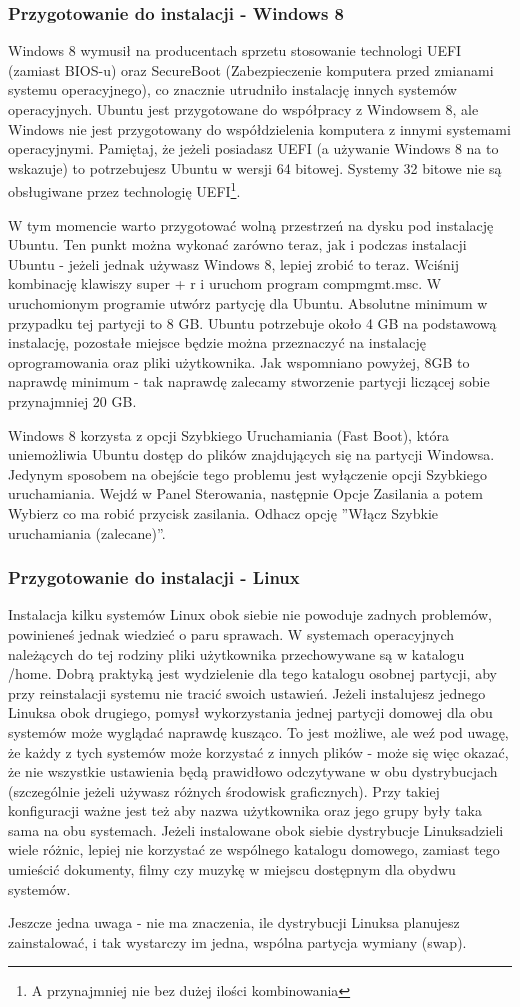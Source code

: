 \subsubsection{Przygotowanie do instalacji - Windows 8}
\label{sec:przygotowanie_windows8}
Windows 8 wymusił na producentach sprzetu stosowanie technologi UEFI (zamiast BIOS-u) oraz SecureBoot (Zabezpieczenie komputera przed zmianami systemu operacyjnego), co znacznie utrudniło instalację innych systemów operacyjnych. Ubuntu jest przygotowane do współpracy z Windowsem 8, ale Windows nie jest przygotowany do współdzielenia komputera z innymi systemami operacyjnymi. Pamiętaj, że jeżeli posiadasz UEFI (a używanie Windows 8 na to wskazuje) to potrzebujesz Ubuntu w wersji 64 bitowej. Systemy 32 bitowe nie są obsługiwane przez technologię UEFI\footnote{A przynajmniej nie bez dużej ilości kombinowania}.

W tym momencie warto przygotować wolną przestrzeń na dysku pod instalację Ubuntu. Ten punkt można wykonać zarówno teraz, jak i podczas instalacji Ubuntu - jeżeli jednak używasz Windows 8, lepiej zrobić to teraz. Wciśnij kombinację klawiszy super + r i uruchom program compmgmt.msc. W uruchomionym programie utwórz partycję dla Ubuntu. Absolutne minimum w przypadku tej partycji to 8 GB. Ubuntu potrzebuje około 4 GB na podstawową instalację, pozostałe miejsce będzie można przeznaczyć na instalację oprogramowania oraz pliki użytkownika. Jak wspomniano powyżej, 8GB to naprawdę minimum - tak naprawdę zalecamy stworzenie partycji liczącej sobie przynajmniej 20 GB.

Windows 8 korzysta z opcji Szybkiego Uruchamiania (Fast Boot), która uniemożliwia Ubuntu dostęp do plików znajdujących się na partycji Windowsa. Jedynym sposobem na obejście tego problemu jest wyłączenie opcji Szybkiego uruchamiania. Wejdź w Panel Sterowania, następnie Opcje Zasilania a potem Wybierz co ma robić przycisk zasilania. Odhacz opcję ”Włącz Szybkie uruchamiania (zalecane)”.

\subsubsection{Przygotowanie do instalacji - Linux}
\label{sec:przygotowanie_linux}
Instalacja kilku systemów Linux obok siebie nie powoduje zadnych problemów, powinieneś jednak wiedzieć o paru sprawach. W systemach operacyjnych należących do tej rodziny pliki użytkownika przechowywane są w katalogu /home. Dobrą praktyką jest wydzielenie dla tego katalogu osobnej partycji, aby przy reinstalacji systemu nie tracić swoich ustawień. Jeżeli instalujesz jednego Linuksa obok drugiego, pomysł wykorzystania jednej partycji domowej dla obu systemów może wyglądać naprawdę kusząco. To jest możliwe, ale weź pod uwagę, że każdy z tych systemów może korzystać z innych plików - może się więc okazać, że nie wszystkie ustawienia będą prawidłowo odczytywane w obu dystrybucjach (szczególnie jeżeli używasz różnych środowisk graficznych). Przy takiej konfiguracji ważne jest też aby nazwa użytkownika oraz jego grupy były taka sama na obu systemach. Jeżeli instalowane obok siebie dystrybucje Linuksadzieli wiele różnic, lepiej nie korzystać ze wspólnego katalogu domowego, zamiast tego umieścić dokumenty, filmy czy muzykę w miejscu dostępnym dla obydwu systemów.

Jeszcze jedna uwaga - nie ma znaczenia, ile dystrybucji Linuksa planujesz zainstalować, i tak wystarczy im jedna, wspólna partycja wymiany (swap).